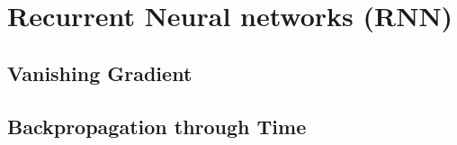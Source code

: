 \section{Recurrent Neural networks (RNN)}\label{sec:rnn}%

\subsection{Vanishing Gradient}%

\subsection{Backpropagation through Time}